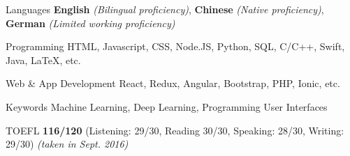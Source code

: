 
\begin{cvskills}
  \cvskill
    {Languages} %
    {\textbf{English} \textit{(Bilingual proficiency)}, \textbf{Chinese} \textit{(Native proficiency)}, \textbf{German} \textit{(Limited working proficiency)}} %

  \cvskill
    {Programming} %
    {HTML, Javascript, CSS, Node.JS, Python, SQL, C/C++, Swift, Java, LaTeX, etc. } %

  \cvskill
    {Web \& App Development} %
    {React, Redux, Angular, Bootstrap, PHP, Ionic, etc.} %
  
  \cvskill
    {Keywords} %
    {Machine Learning, Deep Learning, Programming User Interfaces} %

\end{cvskills}




\begin{cvskills}

  \cvskill
    {TOEFL} %
    {\textbf{116/120} (Listening: 29/30, Reading 30/30, Speaking: 28/30, Writing: 29/30) \textit{(taken in Sept. 2016)}} %

\end{cvskills}